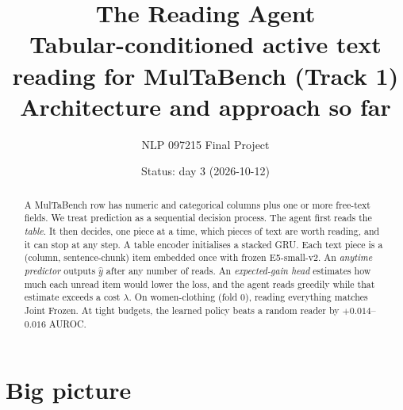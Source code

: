 \documentclass[11pt,a4paper]{article}
\title{\textbf{The Reading Agent}\\[2pt]
\large Tabular-conditioned active text reading for MulTaBench (Track 1)\\[2pt]
\normalsize Architecture and approach so far}
\author{NLP 097215 Final Project}
\date{Status: day 3 (2026-10-12)}
\begin{document}
\maketitle

\begin{abstract}
\noindent
A MulTaBench row has numeric and categorical columns plus one or more free-text fields.
We treat prediction as a sequential decision process.
The agent first reads the \emph{table}.
It then decides, one piece at a time, which pieces of text are worth reading, and it can stop at any step.
A table encoder initialises a stacked GRU.
Each text piece is a (column, sentence-chunk) item embedded once with frozen E5-small-v2.
An \emph{anytime predictor} outputs $\hat y$ after any number of reads.
An \emph{expected-gain head} estimates how much each unread item would lower the loss, and the agent reads greedily while that estimate exceeds a cost $\lambda$.
On women-clothing (fold 0), reading everything matches Joint Frozen.
At tight budgets, the learned policy beats a random reader by $+0.014$--$0.016$ AUROC.
\end{abstract}

\section{Big picture}
\end{document}
